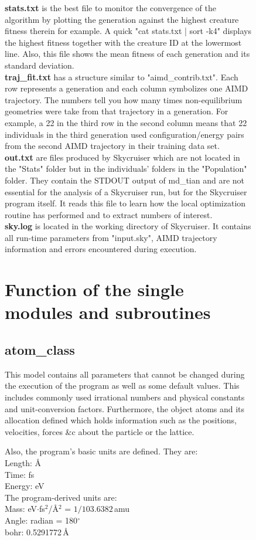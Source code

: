 \documentclass[twoside, 11pt, titlepage, captions=nooneline, a4paper, headsepline]{scrbook}%
\newcommand{\9}{\mathrm}
\newcommand{\0}{\,\mathrm}
\begin{document}
\begin{figure}[b!]
\textbf{stats.txt} is the best file to monitor the convergence of the algorithm by plotting the generation against the highest creature fitness therein for example. A quick "cat stats.txt | sort -k4" displays the highest fitness together with the creature ID at the lowermost line. Also, this file shows the mean fitness of each generation and its standard deviation.\\
\textbf{traj\_fit.txt} has a structure similar to "aimd\_contrib.txt". Each row represents a generation and each column symbolizes one AIMD trajectory. The numbers tell you how many times non-equilibrium geometries were take from that trajectory in a generation. For example, a 22 in the third row in the second column means that 22 individuals in the third generation used configuration/energy pairs from the second AIMD trajectory in their training data set.\\
\textbf{out.txt} are files produced by Skycruiser which are not located in the "Stats" folder but in the individuals' folders in the "Population" folder. They contain the STDOUT output of md\_tian and are not essential for the analysis of a Skycruiser run, but for the Skycruiser program itself. It reads this file to learn how the local optimization routine has performed and to extract numbers of interest.\\
\textbf{sky.log} is located in the working directory of Skycruiser. It contains all run-time parameters from "input.sky", AIMD trajectory information and errors encountered during execution.






\chapter{Function of the single modules and subroutines}
\label{Sec:Modules}
\section{atom\_class}
This model contains all parameters that cannot be changed during the execution of the program as well as some default values. This includes commonly used irrational numbers and physical constants and unit-conversion factors. Furthermore, the object atoms and its allocation defined which holds information such as the positions, velocities, forces \&c about the particle or the lattice.

\noindent Also, the program's basic units  are defined. They are:\\
Length: \AA\\
Time: fs\\
Energy: eV\\
The program-derived units are:\\
Mass: eV$\cdot$fs$^2$/\AA$^2$ = $1/103.6382$\,amu\\
Angle: radian = 180$^\circ$\\
bohr: 0.5291772\,\AA

\end{figure}
\end{document}
